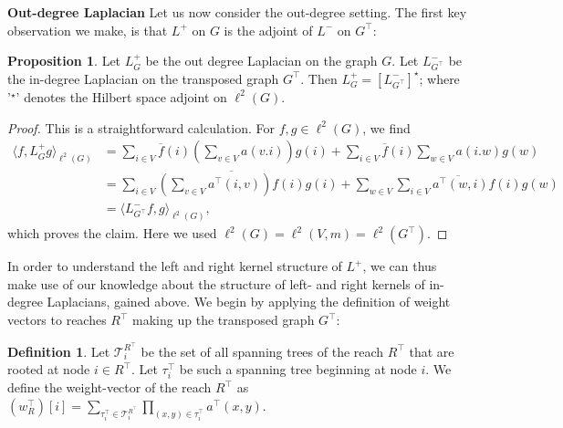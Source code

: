 \documentclass[reqno,12pt,letterpaper]{amsart}
\numberwithin{equation}{section}
\newcommand{\Lin}{L^{-}}
\newcommand{\Lout}{L^{+}}
\newcommand{\1}{\mathds{1}}
\theoremstyle{definition}
\newtheorem{Prop}[Th]{Proposition}
\newtheorem{Def}[Th]{Definition}
\begin{document}
\noindent \textbf{Out-degree Laplacian}
Let us now consider the out-degree setting.    The first key observation we make, is that $\Lout$ on $G$ is the adjoint of
$\Lin$ on $G^\intercal$:
\begin{Prop}\label{in_out_transpose_prop}
	Let $\Lout_G$ be the out degree Laplacian on the graph $G$. Let $\Lin_{G^\intercal}$ be the in-degree Laplacian on the transposed graph $G^\intercal$. Then $\Lout_G = [\Lin_{G^\intercal}]^\star$; where '$^\star$' denotes the Hilbert space adjoint on $\ell^2(G)$.
\end{Prop}
\begin{proof}
	This is a straightforward calculation. For $f,g \in \ell^2(G)$, we find
	\begin{align}
		\langle f, \Lout_G g \rangle_{\ell^2(G)} &= \sum\limits_{i \in V} \overline{f}(i)
		\left( \sum_{v \in V}    a(v.i)    \right)g(i)  
		+
		\sum\limits_{i \in V}
		\overline{f}(i)
		\sum_{w \in V}    a(i.w)    g(w)  \\
		&= 
		\sum\limits_{i \in V} \overline{ \left( \sum_{v \in V}    a^\intercal(i,v)    \right) f(i)}
		g(i)  
		+
		\sum_{w \in V}  
		\overline{ \sum\limits_{i \in V} a^\intercal(w,i) f(i)}
		g(w)  \\
		&= 	\langle \Lin_{G^\intercal} f,  g \rangle_{\ell^2(G)},
	\end{align}
which proves the claim. Here we used $\ell^2(G) = \ell^2(V,m) = \ell^2(G^\intercal)$.
\end{proof}




In order to understand the left and right kernel structure of $\Lout$, we can thus make use of our knowledge about the structure of  left- and right kernels of in-degree Laplacians, gained above. We begin by applying the definition of  weight vectors to reaches $R^\intercal$ making up the transposed graph $G^\intercal$:


\begin{Def}\label{weight_vector_of_trranspose} Let $\mathcal{T}^{R^\intercal}_i$ be the set of all spanning trees of the reach $R^\intercal$ that are rooted at node $i\in R^\intercal$. Let  $\tau^\intercal_i$ be such a spanning tree beginning at node $i$. We define the weight-vector of the reach $R^\intercal$ as 
	$
	(w_R^\intercal)[i] = \sum\limits_{\tau^\intercal_i \in \mathcal{T}^{R^\intercal}_i} \prod\limits_{(x,y)\in\tau^\intercal_i} a^\intercal(x,y).
	$
\end{Def}	
\end{document}
